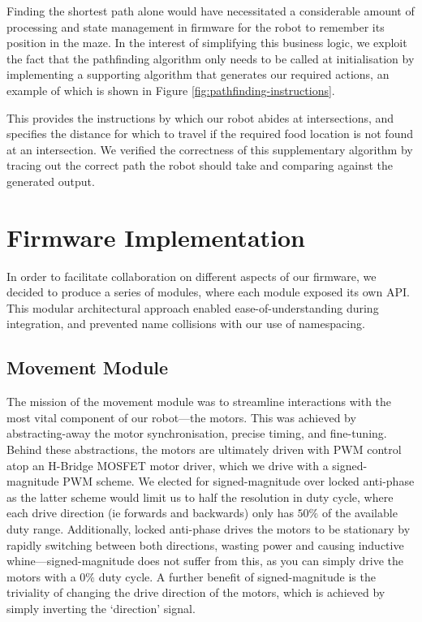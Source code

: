 \documentclass[conference]{IEEEtran}
\begin{document}
Finding the shortest path alone would have necessitated a considerable amount of processing and state management in firmware for the robot to remember its position in the maze.
In the interest of simplifying this business logic, we exploit the fact that the pathfinding algorithm only needs to be called at initialisation by implementing a supporting algorithm that generates our required actions, an example of which is shown in Figure \ref{fig:pathfinding-instructions}.

This provides the instructions by which our robot abides at intersections, and specifies the distance for which to travel if the required food location is not found at an intersection.
We verified the correctness of this supplementary algorithm by tracing out the correct path the robot should take and comparing against the generated output.



\section{Firmware Implementation}

In order to facilitate collaboration on different aspects of our firmware, we decided to produce a series of modules, where each module exposed its own API.
This modular architectural approach enabled ease-of-understanding during integration, and prevented name collisions with our use of namespacing.

\subsection{Movement Module}

The mission of the movement module was to streamline interactions with the most vital component of our robot—the motors.
This was achieved by abstracting-away the motor synchronisation, precise timing, and fine-tuning.
Behind these abstractions, the motors are ultimately driven with PWM control atop an H-Bridge MOSFET motor driver, which we drive with a signed-magnitude PWM scheme.
We elected for signed-magnitude over locked anti-phase as the latter scheme would limit us to half the resolution in duty cycle, where each drive direction (ie forwards and backwards) only has $50\%$ of the available duty range.
Additionally, locked anti-phase drives the motors to be stationary by rapidly switching between both directions, wasting power and causing inductive whine—signed-magnitude does not suffer from this, as you can simply drive the motors with a $0\%$ duty cycle.
A further benefit of signed-magnitude is the triviality of changing the drive direction of the motors, which is achieved by simply inverting the `direction' signal.
\end{document}
